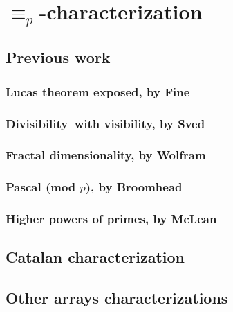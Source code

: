 
\chapter{$\equiv_{p}$-characterization}

\section{Previous work}
\subsection{Lucas theorem exposed, by Fine}
\subsection{Divisibility--with visibility, by Sved}
\subsection{Fractal dimensionality, by Wolfram}
\subsection{Pascal (mod $p$), by Broomhead}
\subsection{Higher powers of primes, by McLean}


\section{Catalan characterization}
\section{Other arrays characterizations}
